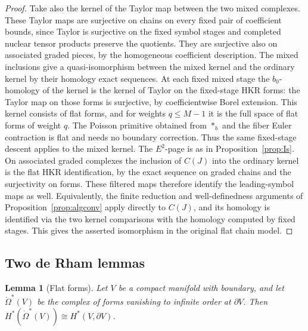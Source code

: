 \documentclass[11pt,oneside,reqno]{article}
\theoremstyle{plain}
\newtheorem{lemma}[theorem]{Lemma}
\theoremstyle{definition}
\theoremstyle{remark}
\begin{document}
\begin{proof}
Take also the kernel of the Taylor map between the two mixed
complexes. These Taylor maps are surjective on chains on
every fixed pair of coefficient bounds, since Taylor is
surjective on the fixed symbol stages and completed nuclear
tensor products preserve the quotients. They are surjective
also on associated graded pieces, by the homogeneous
coefficient description. The mixed inclusions give a
quasi-isomorphism between the mixed kernel and the ordinary
kernel by their homology exact sequences. At each fixed
mixed stage the \(b_0\)-homology of the kernel is the kernel
of Taylor on the fixed-stage HKR forms: the Taylor map
on those forms is surjective, by coefficientwise Borel
extension. This kernel consists of flat forms, and for
weights \(q\leq M-1\) it is the full space of flat forms of
weight \(q\). The Poisson primitive obtained from \(*_b\)
and the fiber Euler contraction is flat and needs no
boundary correction. Thus the same fixed-stage descent
applies to the mixed kernel. The \(E^2\)-page is as in
Proposition~\ref{prop:Is}. On associated graded complexes
the inclusion of \(C(J)\) into the ordinary kernel is the
flat HKR identification, by the exact sequence on graded
chains and the surjectivity on forms. These filtered maps
therefore identify the leading-symbol maps as well.
Equivalently, the finite reduction and well-definedness
arguments of Proposition~\ref{prop:algconv} apply directly
to \(C(J)\), and its homology is identified via the two
kernel comparisons with the homology computed by fixed
stages. This gives the asserted isomorphism in the
original flat chain model.
\end{proof}

\subsection{Two de Rham lemmas}

\begin{lemma}[Flat forms]\label{lem:flat}
Let \(V\) be a compact manifold with boundary, and let
\(\dot\Omega^*(V)\) be the complex of forms vanishing to infinite order at
\(\partial V\). Then \(H^*(\dot\Omega^*(V))\cong H^*(V,\partial V)\).
\end{lemma}
\end{document}
